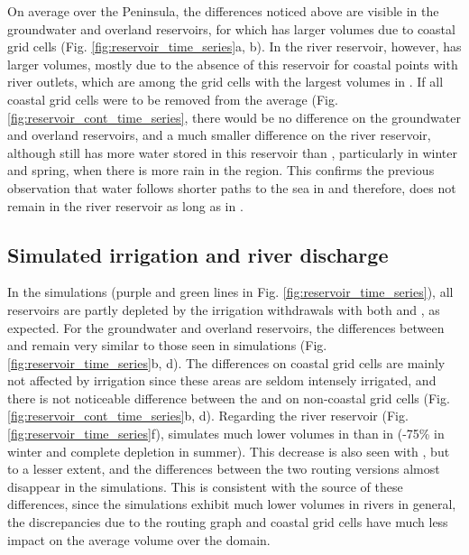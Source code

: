 On average over the Peninsula, the differences noticed above are visible in the groundwater and overland reservoirs, for which \native has larger volumes due to coastal grid cells (Fig. \ref{fig:reservoir_time_series}a, b). In the river reservoir, however, \std has larger volumes, mostly due to the absence of this reservoir for \native coastal points with river outlets, which are among the grid cells with the largest volumes in \std.
If all coastal grid cells were to be removed from the average (Fig. \ref{fig:reservoir_cont_time_series}, there would be no difference on the groundwater and overland reservoirs, and a much smaller difference on the river reservoir, although \std still has more water stored in this reservoir than \native, particularly in winter and spring, when there is more rain in the region. This confirms the previous observation that water follows shorter paths to the sea in \native and therefore, does not remain in the river reservoir as long as in \std.
\subsection{Simulated irrigation and river discharge}

In the \irr simulations (purple and green lines in Fig. \ref{fig:reservoir_time_series}), all reservoirs are partly depleted by the irrigation withdrawals with both \std and \native, as expected. 
For the groundwater and overland reservoirs, the differences between \std and \native remain very similar to those seen in \noirr simulations (Fig. \ref{fig:reservoir_time_series}b, d). The differences on coastal grid cells are mainly not affected by irrigation since these areas are seldom intensely irrigated, and there is not noticeable difference between the \std and \native on non-coastal grid cells (Fig. \ref{fig:reservoir_cont_time_series}b, d).
Regarding the river reservoir (Fig. \ref{fig:reservoir_time_series}f), \std simulates much lower volumes in \irr than in \noirr (-75\% in winter and complete depletion in summer). This decrease is also seen with \native, but to a lesser extent, and the differences between the two routing versions almost disappear in the  \irr simulations.
This is consistent with the source of these differences, since the \irr simulations exhibit much lower volumes in rivers in general, the discrepancies due to the routing graph and coastal grid cells have much less impact on the average volume over the domain.

